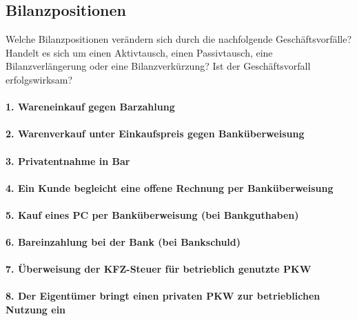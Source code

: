 \documentclass[paper=a4, fontsize=11pt]{scrartcl}
\numberwithin{equation}{section}
\numberwithin{figure}{section}
\numberwithin{table}{section}
\begin{document}

\subsection{Bilanzpositionen}

Welche Bilanzpositionen verändern sich durch die nachfolgende Geschäftsvorfälle? Handelt es sich um einen Aktivtausch, einen Passivtausch, eine Bilanzverlängerung oder eine Bilanzverkürzung? Ist der Geschäftsvorfall erfolgswirksam? \\

\paragraph{1. Wareneinkauf gegen Barzahlung}

\paragraph{2. Warenverkauf unter Einkaufspreis gegen Banküberweisung}

\paragraph{3. Privatentnahme in Bar}

\paragraph{4. Ein Kunde begleicht eine offene Rechnung per Banküberweisung}

\paragraph{5. Kauf eines PC per Banküberweisung (bei Bankguthaben)}

\paragraph{6. Bareinzahlung bei der Bank (bei Bankschuld)}

\paragraph{7. Überweisung der KFZ-Steuer für betrieblich genutzte PKW}

\paragraph{8. Der Eigentümer bringt einen privaten PKW zur betrieblichen Nutzung ein}
\end{document}
